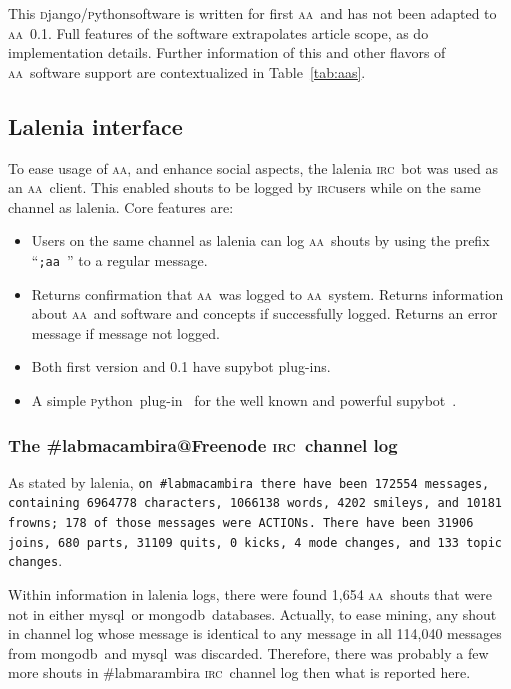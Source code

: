 \documentclass[a4paper, 11pt]{article} %
\newcommand{\python}{\textsc{p}ython}
\newcommand{\django}{\textsc{d}jango}
\newcommand{\irc}{\textsc{irc}}
\newcommand{\aab}{\textsc{aa}}
\newcommand{\mongodb}{{\sc m}ongo{\sc db}}
\newcommand{\mysql}{{\sc m}y{\sc sql}}
\begin{document}
This \django/\python software is written for first \aab\ and has not been adapted to \aab\ 0.1.
Full features of the software extrapolates article scope, as do implementation details. Further information of this and other flavors of \aab\ software support are contextualized in Table~\ref{tab:aas}.

\subsection{Lalenia interface}\label{sec:lalenia}
To ease usage of \aab, and enhance social aspects, the lalenia \irc\ bot was used as an \aab\ client. This enabled shouts to be logged by \irc users while on the same channel as lalenia. Core features are:
\begin{itemize}
    \item Users on the same channel as lalenia can log \aab\ shouts by using the prefix ``\texttt{;aa }'' to a regular message.
    \item Returns confirmation that \aab\ was logged to \aab\ system. Returns information about \aab\ and software and concepts if successfully logged. Returns an error message if message not logged.
    \item Both first version and 0.1 have supybot plug-ins.
    \item A simple \python\ plug-in~\cite{laleniaPlug} for the well known and powerful supybot~\cite{supybot}.
\end{itemize}


\subsubsection{The \#labmacambira@Freenode \irc\ channel log}
As stated by lalenia, {\tt on \#labmacambira there have been 172554 messages, containing 6964778 characters, 1066138 words, 4202 smileys, and 10181 frowns; 178 of those messages were ACTIONs.  There have been 31906 joins, 680 parts, 31109 quits, 0 kicks, 4 mode changes, and 133 topic changes}.

Within information in lalenia logs, there were found 1,654 \aab\ shouts that were not in either \mysql\ or \mongodb\ databases. Actually, to ease mining, any shout in channel log whose message is identical to any message in all 114,040 messages from \mongodb\ and \mysql\ was discarded. Therefore, there was probably a few more shouts in \#labmarambira \irc\ channel log then what is reported here.
\end{document}
